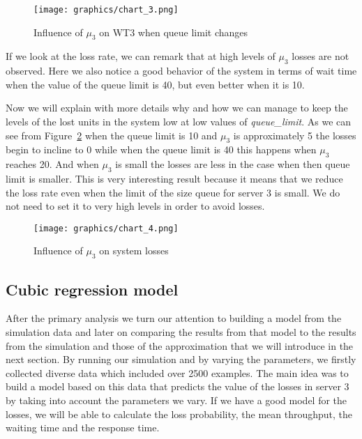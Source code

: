 \documentclass[12pt]{article}
\theoremstyle{plain}
\begin{document}
\begin{figure}
  \caption{Influence of $\mu_3$ on WT3 when queue limit changes}
  \texttt{[image: graphics/chart\_3.png]}\\
  \label{fig:influence_of_mu3_on_wt3_when_queue_limit_changes}
\end{figure}

If we look at the loss rate, we can remark that at high levels of $\mu_3$ losses
are not observed. Here we also notice a good behavior of the system in terms of
wait time when the value of the queue limit is 40, but even better when it is
10.  

Now we will explain with more details why and how we can manage to keep the
levels of the lost units in the system low at low values of \emph{queue\_limit}.
As we can see from Figure~\ref{fig:influence_of_mu3_on_system:losses} when the
queue limit is 10 and $\mu_3$ is approximately 5 the losses begin to incline to 0
while when the queue limit is 40 this happens when $\mu_3$ reaches 20. And when
$\mu_3$ is small the losses are less in the case when then queue limit is
smaller. This is very interesting result because it means that we reduce
the loss rate even when the limit of the size queue for server 3 is small. We
do not need to set it to very high levels in order to avoid losses.  

\begin{figure}
  \caption{Influence of $\mu_3$ on system losses}
  \texttt{[image: graphics/chart\_4.png]}\\
  \label{fig:influence_of_mu3_on_system:losses}
\end{figure}

\subsection*{\textbf{Cubic regression model}
}

After the primary analysis we turn our attention to building a model from the
simulation data and later on comparing the results from that model to the
results from the simulation and those of the approximation that we will
introduce in the next section. By running our simulation and by varying the
parameters, we firstly collected diverse data which included over 2500
examples. The main idea was to build a model based on this data that predicts
the value of the losses in server 3 by taking into account the parameters we
vary. If we have a good model for the losses, we will be able to calculate the
loss probability, the mean throughput, the waiting time and the response time.
\end{document}
